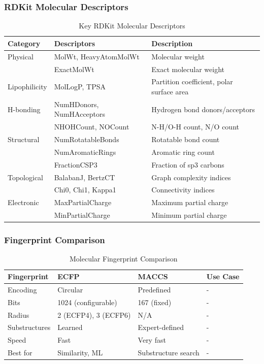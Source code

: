 \documentclass[11pt,a4paper]{article}
\begin{document}
\subsubsection{RDKit Molecular Descriptors}

\begin{table}[H]
\centering
\caption{Key RDKit Molecular Descriptors}
\begin{tabular}{@{}lll@{}}
\toprule
\textbf{Category} & \textbf{Descriptors} & \textbf{Description} \\
\midrule
Physical & MolWt, HeavyAtomMolWt & Molecular weight \\
 & ExactMolWt & Exact molecular weight \\
\midrule
Lipophilicity & MolLogP, TPSA & Partition coefficient, polar surface area \\
\midrule
H-bonding & NumHDonors, NumHAcceptors & Hydrogen bond donors/acceptors \\
 & NHOHCount, NOCount & N-H/O-H count, N/O count \\
\midrule
Structural & NumRotatableBonds & Rotatable bond count \\
 & NumAromaticRings & Aromatic ring count \\
 & FractionCSP3 & Fraction of sp3 carbons \\
\midrule
Topological & BalabanJ, BertzCT & Graph complexity indices \\
 & Chi0, Chi1, Kappa1 & Connectivity indices \\
\midrule
Electronic & MaxPartialCharge & Maximum partial charge \\
 & MinPartialCharge & Minimum partial charge \\
\bottomrule
\end{tabular}
\end{table}

\subsubsection{Fingerprint Comparison}

\begin{table}[H]
\centering
\caption{Molecular Fingerprint Comparison}
\begin{tabular}{@{}llll@{}}
\toprule
\textbf{Fingerprint} & \textbf{ECFP} & \textbf{MACCS} & \textbf{Use Case} \\
\midrule
Encoding & Circular & Predefined & - \\
Bits & 1024 (configurable) & 167 (fixed) & - \\
Radius & 2 (ECFP4), 3 (ECFP6) & N/A & - \\
Substructures & Learned & Expert-defined & - \\
Speed & Fast & Very fast & - \\
Best for & Similarity, ML & Substructure search & - \\
\bottomrule
\end{tabular}
\end{table}
\end{document}
